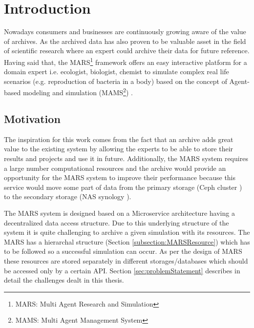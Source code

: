 \newpage
    \chapter{Introduction}
    Nowadays consumers and businesses are continuously growing aware of the value of archives. As the archived data has also proven
    to be valuable asset in the field of scientific research where an expert could archive their data for future reference. Having said that, the 
    MARS\footnote{MARS: Multi Agent Research and Simulation} framework offers an easy interactive platform for a domain expert i.e. ecologist, biologist, 
    chemist to simulate complex real life scenarios (e.g. reproduction of bacteria in a body) based on the concept of Agent-based modeling and simulation 
    (MAMS\footnote{MAMS: Multi Agent Management System}) \cite{agentModeling}.

        \section{Motivation}
        The inspiration for this work comes from the fact that an archive adds great value to the existing system by allowing the experts to be
        able to store their results and projects and use it in future. Additionally, the MARS system requires a large number computational resources and
        the archive would provide an opportunity for the MARS system to improve their
        performance because this service would move some part of data from the primary storage (Ceph cluster \cite{Ceph}) to the secondary storage (NAS synology \cite{Synology}). 

        The MARS system is designed based on a Microservice architecture \cite{MicroserviceNewMan} having a decentralized data \cite{atomic} access structure. 
        Due to this underlying structure of the system it is quite challenging to archive a given simulation with its resources. The MARS has a hierarchal
        structure (Section \ref{subsection:MARSResource}) which has to be followed so a successful simulation can occur. As per the design of MARS these resources
        are stored separately in different storages/databases which should be accessed only by a certain API. Section
        \ref{sec:problemStatement} describes in detail the challenges dealt in this thesis.  


